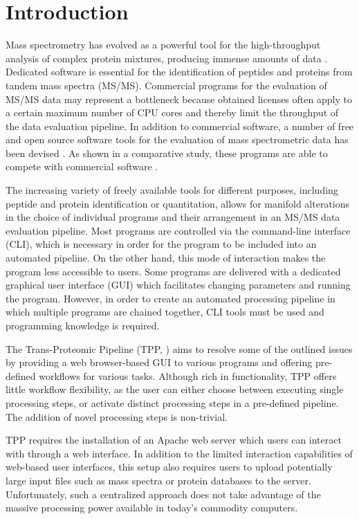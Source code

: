 \section{Introduction}

Mass spectrometry has evolved as a powerful tool for the high-throughput
analysis of complex protein mixtures, producing immense
amounts of data \cite[]{aebersold_mass_2003}. 
Dedicated software is essential for the identification of peptides and proteins
from tandem mass spectra (MS/MS).
Commercial programs for the evaluation of MS/MS data 
\cite[]{eng_approach_1994, perkins_probability-based_1999}
may represent a bottleneck because obtained licenses often apply to a 
certain maximum number of CPU cores and thereby limit the throughput of the 
data evaluation pipeline.
In addition to commercial software, a number of free and open source 
software tools for the evaluation of mass spectrometric data has been devised
\cite[]{geer_open_2004, craig_tandem:_2004}. 
As shown in a comparative study, these programs are able to compete with 
commercial software \cite[]{balgley_comparative_2007}.

The increasing variety of freely available tools for different purposes, 
including peptide and protein identification or quantitation, allows for 
manifold alterations in the choice of individual programs and their arrangement 
in an MS/MS data evaluation pipeline.
Most programs are controlled via the command-line interface (CLI), which is
necessary in order for the program to be included into an automated pipeline.
On the other hand, this mode of interaction makes the program less accessible 
to users.
Some programs are delivered with a dedicated graphical user interface (GUI)
which facilitates changing parameters and running the program. 
However, in order to create an automated processing pipeline in which multiple 
programs are chained together, CLI tools must be used and programming knowledge 
is required.

The Trans-Proteomic Pipeline (TPP, \cite[]{keller_uniform_2005}) aims to 
resolve some of the outlined issues by providing a web browser-based GUI to 
various programs and offering pre-defined workflows for various tasks. 
Although rich in functionality, TPP offers little workflow flexibility, as the 
user can either choose between executing single processing steps, or activate 
distinct processing steps in a pre-defined pipeline.
The addition of novel processing steps is non-trivial.

TPP requires the installation of an Apache web server which users can interact
with through a web interface.
In addition to the limited interaction capabilities of web-based user interfaces,
this setup also requires users to upload potentially large input files such as 
mass spectra or protein databases to the server.
Unfortunately, such a centralized approach does not take advantage of the 
massive processing power available in today's commodity computers.


